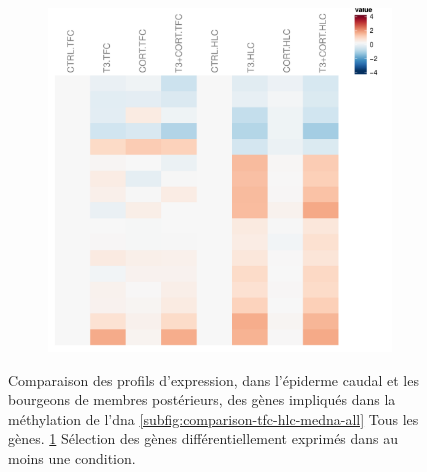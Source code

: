 \begin{figure}[!htbp]
\begin{subfigure}{0.45\textwidth}
	\includegraphics[width=\textwidth]
	{Figures/comparison-tfc-hlc-medna/comparison-tfc-hlc-medna-de.pdf}
	\caption{}
	\label{subfig:comparison-tfc-hlc-medna-de}
\end{subfigure}
\caption[Profils d'expression des gènes impliqués dans la méthylation de l'ADN]
{
Comparaison des profils d'expression, dans l'épiderme caudal et les bourgeons de membres postérieurs, des gènes impliqués dans la méthylation de l'\gls{dna}
\ref{subfig:comparison-tfc-hlc-medna-all} Tous les gènes.
\ref{subfig:comparison-tfc-hlc-medna-de} Sélection des gènes différentiellement exprimés dans au moins une condition.
}
\label{fig:comparison-tfc-hlc-medna}
%
\end{figure}
%
